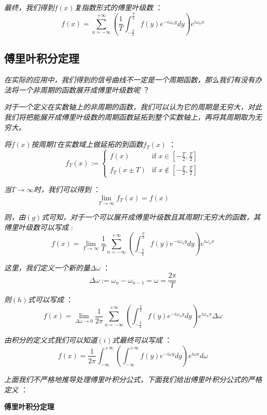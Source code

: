 \textit{最终，我们得到$f(x)$复指数形式的傅里叶级数 }：
\[f(x)=\sum_{n=-\infty}^{+\infty}(\frac{1}{T}\int_{-\frac{T}{2}}^{\frac{T}{2}}f(y)e^{-i\omega_n y}dy)e^{i\omega_n x} \tag{g}\]

\subsection{傅里叶积分定理}

\textit{在实际的应用中，我们得到的信号曲线不一定是一个周期函数，那么我们有没有办法将一个非周期的函数展开成傅里叶级数呢} ？

\textit{对于一个定义在实数轴上的非周期的函数，我们可以认为它的周期是无穷大，对此我们将把能展开成傅里叶级数的周期函数延拓到整个实数轴上，再将其周期取为无穷大。}

\textit{将$f(x)$按周期$T$在实数域上做延拓的到函数$f_T(x)$ }：
\[ f_T(x) := \left\{
\begin{array}{rl}
f(x) & \text{if } x \in [-\frac{T}{2},\frac{T}{2}]\\
f_T(x \pm T) & \text{if } x \notin [-\frac{T}{2},\frac{T}{2}] 
\end{array} \right. \]

\textit{当$T \rightarrow \infty$时，我们可以得到 }：
\[\lim_{T \rightarrow \infty}{f_T(x)=f(x)}\]

\textit{则，由$(g)$式可知，对于一个可以展开成傅里叶级数且其周期$T$无穷大的函数，其傅里叶级数可以写成 }:
\[f(x)=\lim_{T \rightarrow \infty}\frac{1}{T}\sum_{n=-\infty}^{+\infty}(\int_{-\frac{T}{2}}^{\frac{T}{2}}f(y)e^{-i\omega_n y}dy)e^{i\omega_n x} \tag{h}\]

\textit{这里，我们定义一个新的量$\Delta{\omega}$ }：
\[\Delta{\omega}:=\omega_n-\omega_{n-1}=\omega=\frac{2\pi}{T}\]

\textit{则$(h)$式可以写成 }：
\[f(x)=\lim_{\Delta{\omega} \rightarrow 0}\frac{1}{2\pi}\sum_{n=-\infty}^{+\infty}(\int_{-\frac{T}{2}}^{\frac{T}{2}}f(y)e^{-i\omega_n y}dy)e^{i\omega_n x}\Delta{\omega} \tag{i}\]

\textit{由积分的定义式我们可以知道$(i)$式最终可以写成 }：
\[f(x)=\frac{1}{2\pi}\int_{-\infty}^{+\infty}(\int_{-\infty}^{+\infty}f(y)e^{-i\omega y}dy)e^{i\omega x}d\omega \tag{j}\]

\textit{上面我们不严格地推导处理傅里叶积分公式，下面我们给出傅里叶积分公式的严格定义 }：

\textbf{傅里叶积分定理}


\qquad \qquad {}

